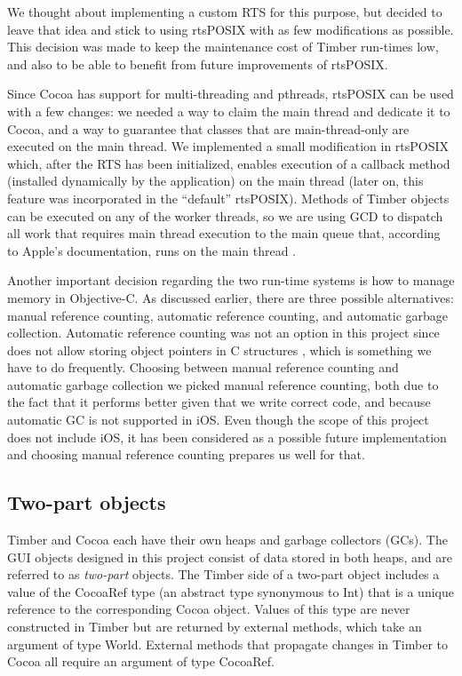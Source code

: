 \documentclass[a4paper]{article}
\begin{document}
We thought about implementing a custom RTS for this purpose, but decided to leave that idea and stick to using rtsPOSIX with as few modifications as possible. This decision was made to keep the maintenance cost of Timber run-times low, and also to be able to benefit from future improvements of rtsPOSIX.

Since Cocoa has support for multi-threading and pthreads, rtsPOSIX can be used with a few changes: we needed a way to claim the main thread and dedicate it to Cocoa, and a way to guarantee that classes that are main-thread-only are executed on the main thread. We implemented a small modification in rtsPOSIX which, after the RTS has been initialized, enables execution of a callback method (installed dynamically by the application) on the main thread (later on, this feature was incorporated in the ``default'' rtsPOSIX). Methods of Timber objects can be executed on any of the worker threads, so we are using GCD to dispatch all work that requires main thread execution to the main queue that, according to Apple's documentation, runs on the main thread \cite{gcdMainQueue}.

Another important decision regarding the two run-time systems is how to manage memory in Objective-C. As discussed earlier, there are three possible alternatives: manual reference counting, automatic reference counting, and automatic garbage collection. Automatic reference counting was not an option in this project since does not allow storing object pointers in C structures \cite{arcIOS}, which is something we have to do frequently. Choosing between manual reference counting and automatic garbage collection we picked manual reference counting, both due to the fact that it performs better given that we write correct code, and because automatic GC is not supported in iOS. Even though the scope of this project does not include iOS, it has been considered as a possible future implementation and choosing manual reference counting prepares us well for that.

\subsection{Two-part objects}
Timber and Cocoa each have their own heaps and garbage collectors (GCs). The GUI objects designed in this project consist of data stored in both heaps, and are referred to as \textit{two-part} objects. The Timber side of a two-part object includes a value of the CocoaRef type (an abstract type synonymous to Int) that is a unique reference to the corresponding Cocoa object. Values of this type are never constructed in Timber but are returned by external methods, which take an argument of type World. External methods that propagate changes in Timber to Cocoa all require an argument of type CocoaRef.
\end{document}
